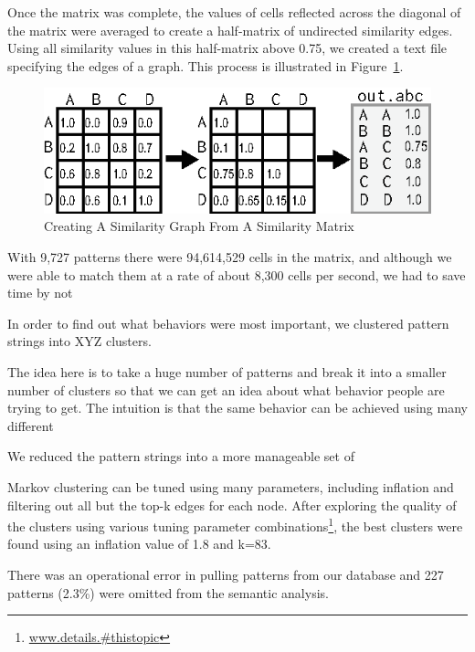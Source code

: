 Once the matrix was complete, the values of cells reflected across the diagonal of the matrix were averaged to create a half-matrix of undirected similarity edges.  Using all similarity values in this half-matrix above 0.75, we created a text file specifying the edges of a graph.  This process is illustrated in Figure~\ref{fig:matrixToGraph}.

\begin{figure}[htb]
\centering
\includegraphics[width=\columnwidth]{../illustrations/matrixToGraph.eps}
\caption{Creating A Similarity Graph From A Similarity Matrix}
\label{fig:matrixToGraph}
\end{figure}


With 9,727 patterns there were 94,614,529 cells in the matrix, and although we were able to match them at a rate of about 8,300 cells per second, we had to save time by not


In order to find out what behaviors were most important, we clustered  pattern strings into XYZ clusters.


The idea here is to take a huge number of patterns and break it into a smaller number of clusters so that we can get an idea about what behavior people are trying to get.  The intuition is that the same behavior can be achieved using many different



We reduced the  pattern strings into a more manageable set of

Markov clustering can be tuned using many parameters, including inflation and filtering out all but the top-k edges for each node.  After exploring the quality of the clusters using various tuning parameter combinations\footnote{\url{www.details.#thistopic}}, the best clusters were found using an inflation value of 1.8 and k=83.

There was an operational error in pulling  patterns from our database and 227 patterns (2.3\%) were omitted from the semantic analysis.

